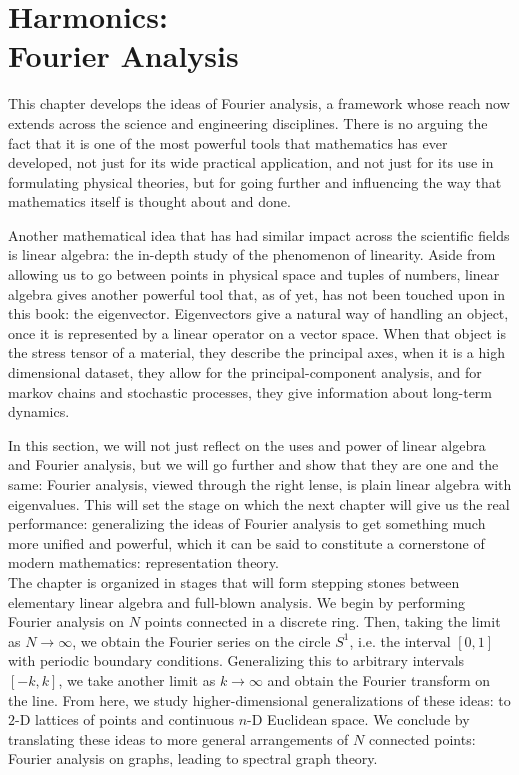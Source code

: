 \documentclass[../master.tex]{subfiles}
\begin{document}
\chapter[Harmonics: Fourier Analysis]{Harmonics:\\ Fourier Analysis}

	This chapter develops the ideas of Fourier analysis, a framework whose reach now extends across the science and engineering disciplines. There is no arguing the fact that it is one of the most powerful tools that mathematics has ever developed, not just for its wide practical application, and not just for its use in formulating physical theories, but for going further and influencing the way that mathematics itself is thought about and done. 
	
	Another mathematical idea that has had similar impact across the scientific fields is linear algebra: the in-depth study of the phenomenon of linearity. Aside from allowing us to go between points in physical space and tuples of numbers, linear algebra gives another powerful tool that, as of yet, has not been touched upon in this book: the eigenvector. Eigenvectors give a natural way of handling an object, once it is represented by a linear operator on a vector space. When that object is the stress tensor of a material, they describe the principal axes, when it is a high dimensional dataset, they allow for the principal-component analysis, and for markov chains and stochastic processes, they give information about long-term dynamics. 
	
	In this section, we will not just reflect on the uses and power of linear algebra and Fourier analysis, but we will go further and show that they are one and the same: Fourier analysis, viewed through the right lense, is plain linear algebra with eigenvalues. This will set the stage on which the next chapter will give us the real performance: generalizing the ideas of Fourier analysis to get something much more unified and powerful, which it can be said to constitute a cornerstone of modern mathematics: representation theory. \\
	
	The chapter is organized in stages that will form stepping stones between elementary linear algebra and full-blown analysis. We begin by performing Fourier analysis on $N$ points connected in a discrete ring. Then, taking the limit as $N \to \infty$, we obtain the Fourier series on the circle $S^1$, i.e. the interval $[0,1]$ with periodic boundary conditions. Generalizing this to arbitrary intervals $[-k, k]$, we take another limit as $k \to \infty$ and obtain the Fourier transform on the line. From here, we study higher-dimensional generalizations of these ideas: to $2$-D lattices of points and continuous $n$-D Euclidean space. We conclude by translating these ideas to more general arrangements of $N$ connected points: Fourier analysis on graphs, leading to spectral graph theory. 
\end{document}

